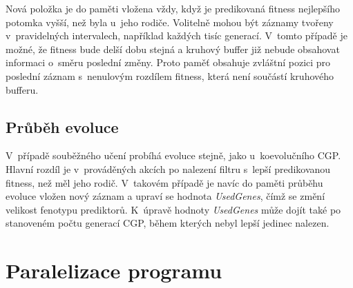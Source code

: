 Nová položka je do paměti vložena vždy, když je predikovaná fitness nejlepšího potomka vyšší, než byla u~jeho rodiče. Volitelně mohou být záznamy tvořeny v~pravidelných intervalech, například každých tisíc generací. V~tomto případě je možné, že fitness bude delší dobu stejná a kruhový buffer již nebude obsahovat informaci o~směru poslední změny. Proto paměť obsahuje zvláštní pozici pro poslední záznam s~nenulovým rozdílem fitness, která není součástí kruhového bufferu.






\subsection{Průběh evoluce}

V~případě souběžného učení probíhá evoluce stejně, jako u~koevolučního CGP. Hlavní rozdíl je v~prováděných akcích po nalezení filtru s~lepší predikovanou fitness, než měl jeho rodič. V~takovém případě je navíc do paměti průběhu evoluce vložen nový záznam a upraví se hodnota \emph{UsedGenes}, čímž se změní velikost fenotypu prediktorů. K~úpravě hodnoty \emph{UsedGenes} může dojít také po stanoveném počtu generací CGP, během kterých nebyl lepší jedinec nalezen.

\section{Paralelizace programu}
\label{secDesignParallel}

